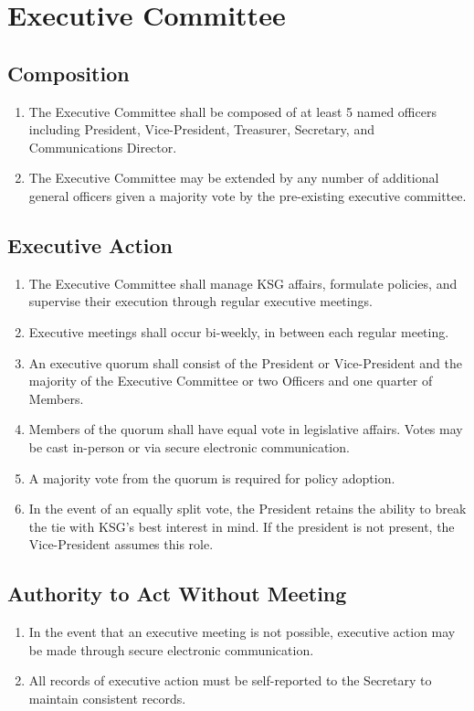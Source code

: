 \documentclass[12pt,executivepaper]{article}
\begin{document}
\section{Executive Committee}

\subsection{Composition}
\begin{enumerate}
    \item The Executive Committee shall be composed of at least 5 named officers including
          President, Vice-President, Treasurer, Secretary, and Communications Director. 
    \item The Executive Committee may be extended by any number of additional general officers
          given a majority vote by the pre-existing executive committee.
\end{enumerate}

\subsection{Executive Action}
\begin{enumerate}
    \item The Executive Committee shall manage KSG affairs, formulate policies, and supervise
          their execution through regular executive meetings.
    \item Executive meetings shall occur bi-weekly, in between each regular meeting.
    \item An executive quorum shall consist of the President or Vice-President and the
          majority of the Executive Committee or two Officers and one quarter of Members.
    \item Members of the quorum shall have equal vote in legislative affairs.
          Votes may be cast in-person or via secure electronic communication.
    \item A majority vote from the quorum is required for policy adoption.
    \item In the event of an equally split vote, the President retains the ability to
          break the tie with KSG's best interest in mind. If the president is not present,
          the Vice-President assumes this role.
\end{enumerate}

\subsection{Authority to Act Without Meeting}
\begin{enumerate}
    \item In the event that an executive meeting is not possible, executive action
          may be made through secure electronic communication.
    \item All records of executive action must be self-reported to the Secretary to
          maintain consistent records.
\end{enumerate}
\end{document}
